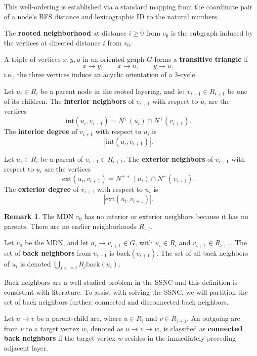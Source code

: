 \documentclass[AMS, Times1COL]{article} %
\theoremstyle{definition}
\newtheorem{remark}{Remark}[section]
\begin{document}
	This well-ordering is established via a standard mapping from the coordinate pair of a node's BFS distance and lexicographic ID to the natural numbers. 
	
	The \textbf{rooted neighborhood} at distance $i \ge 0$ from $v_0$ is the subgraph induced by the vertices at directed distance $i$ from $v_0$.
	
	A triple of vertices $x,y,u$ in an oriented graph $G$ forms a \textbf{transitive triangle} if $$ x \to y,\qquad x \to u,\qquad y \to u, $$ i.e., the three vertices induce an acyclic orientation of a 3-cycle.
	
	Let $u_i \in R_i$ be a parent node in the rooted layering, and let $v_{i+1} \in R_{i+1}$ be one of its children. The \textbf{interior neighbors} of $v_{i+1}$ with respect to $u_i$ are the vertices $$ \text{int}(u_i, v_{i+1}) = N^+(u_i) \cap N^+(v_{i+1}). $$ The \textbf{interior degree} of $v_{i+1}$ with respect to $u_i$ is $$ |\text{int}(u_i, v_{i+1})|.  $$\label{int_nbr}
	
	Let $u_i \in R_i$ be a parent of $v_{i+1} \in R_{i+1}$. The \textbf{exterior neighbors} of $v_{i+1}$ with respect to $u_i$ are the vertices $$ \text{ext}(u_i,v_{i+1}) = N^{++}(u_i) \cap N^+(v_{i+1}). $$
	The \textbf{exterior degree} of $v_{i+1}$ with respect to $u_i$ is $$ |\text{ext}(u_i, v_{i+1})|. $$\label{ext_nbr}
	
	\begin{remark} The MDN $v_0$ has no interior or exterior neighbors because it has no parents. There are no earlier neighborhoods $R_{-1}$. 
	\end{remark}
	
	Let $v_0$ be the MDN, and let $u_i \to v_{i+1} \in G$, with $u_i \in R_i$ and $v_{i+1} \in R_{i+1}$. The set of \textbf{back neighbors} from $v_{i+1}$ is $\text{back}(v_{i+1})$. The set of all back neighbors of $u_i$ is denoted $\bigcup_{j <= i} R_j \text{back}(u_i)$. \label{back_def} 
	
	Back neighbors are a well-studied problem in the SSNC and this definition is consistent with literature. To assist with solving the SSNC, we will partition the set of back neighbors further: connected and disconnected back neighbors. 
	
	Let $u \to v$ be a parent-child arc, where $u \in R_i$ and $v \in R_{i+1}$. An outgoing arc from $v$ to a target vertex $w$, denoted as $u \to v \to w$, is classified as \textbf{connected back neighbors} if the target vertex $w$ resides in the immediately preceding adjacent layer. \label{conn_back_def}
	
\end{document}
